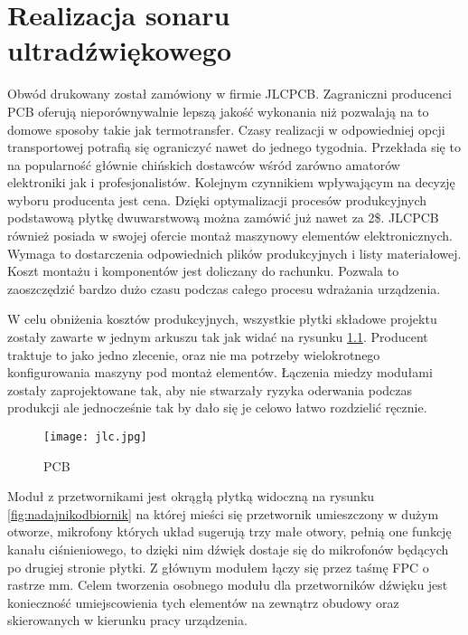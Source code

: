 \chapter[Realizacja sonaru ultradźwiękowego]{Realizacja sonaru ultradźwiękowego}

\label{chapter:realizacja}
Obwód drukowany został zamówiony w firmie JLCPCB. Zagraniczni producenci PCB oferują nieporównywalnie lepszą jakość wykonania 
niż pozwalają na to domowe sposoby takie jak termotransfer. Czasy realizacji w odpowiedniej opcji transportowej potrafią się 
ograniczyć nawet do jednego tygodnia. Przekłada się to na popularność głównie chińskich dostawców wśród zarówno amatorów elektroniki jak i profesjonalistów. Kolejnym czynnikiem 
wpływającym na decyzję wyboru producenta jest cena. Dzięki optymalizacji procesów produkcyjnych podstawową płytkę dwuwarstwową można zamówić już nawet za 2\$.
JLCPCB również posiada w swojej ofercie montaż maszynowy elementów elektronicznych. Wymaga to dostarczenia odpowiednich plików produkcyjnych i listy materiałowej. 
Koszt montażu i komponentów jest doliczany do rachunku. Pozwala to zaoszczędzić bardzo dużo czasu podczas całego procesu wdrażania urządzenia. 

W celu obniżenia kosztów produkcyjnych, wszystkie płytki składowe projektu zostały zawarte w jednym arkuszu tak jak widać na rysunku \ref{fig:pcb}. Producent traktuje to jako jedno zlecenie, oraz nie ma potrzeby 
wielokrotnego konfigurowania maszyny pod montaż elementów. Łączenia miedzy modułami zostały zaprojektowane tak, aby nie stwarzały ryzyka oderwania podczas produkcji 
ale jednocześnie tak by dało się je celowo łatwo rozdzielić ręcznie. 

\begin{figure}[ht!]
    \centering
    \texttt{[image: jlc.jpg]}
    \caption{PCB}
    \label{fig:pcb}
\end{figure}

\clearpage
Moduł z przetwornikami jest okrągłą płytką widoczną na rysunku \ref{fig:nadajnikodbiornik} na której mieści się przetwornik umieszczony w dużym otworze, 
mikrofony których układ sugerują trzy małe otwory, pełnią one funkcję kanału ciśnieniowego, to dzięki nim dźwięk dostaje się do mikrofonów będących po drugiej stronie płytki.
Z głównym modułem łączy się przez taśmę FPC o rastrze \unit[0,5]{mm}. Celem tworzenia osobnego modułu dla przetworników dźwięku jest konieczność umiejscowienia tych elementów 
na zewnątrz obudowy oraz skierowanych w kierunku pracy urządzenia.

